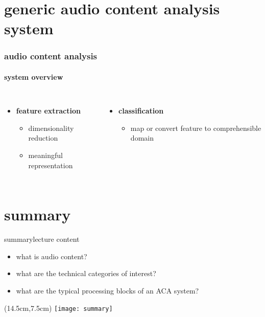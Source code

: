     \section[ACA]{generic audio content analysis system}
        \begin{frame}\frametitle{audio content analysis}\framesubtitle{system overview}
            \begin{figure}
                \centering
            \end{figure}
            
            \begin{columns}
                    \begin{itemize}
                        \item<2->[]	\textbf{feature extraction}
                                \begin{itemize}
                                    \item 	dimensionality reduction
                                    \item	meaningful representation
                                \end{itemize}
                    \end{itemize}
                    \begin{itemize}
                        \item<3->[]	\textbf{classification}
                                \begin{itemize}
                                    \item	map or convert feature to comprehensible domain
                                \end{itemize}
                    \end{itemize}
            \end{columns}
        \end{frame}

    \section{summary}
        \begin{frame}{summary}{lecture content}
            \begin{itemize}
                \item       what is audio content?
                \bigskip
                \item<2->   what are the technical categories of interest?
                \bigskip
                \item<3->   what are the typical processing blocks of an ACA system?
            \end{itemize}
            \begin{textblock*}{100mm}(14.5cm,7.5cm)
                \texttt{[image: summary]}
            \end{textblock*}
        \end{frame}


